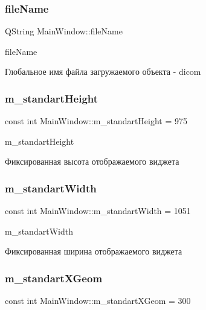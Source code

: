 \subsubsection{\texorpdfstring{file\+Name}{fileName}}
{\footnotesize\ttfamily Q\+String Main\+Window\+::file\+Name}



file\+Name 

Глобальное имя файла загружаемого объекта -\/ dicom \mbox{\label{classMainWindow_a5ebb2638e7863a72adc4e6f75336bd77}} 
\subsubsection{\texorpdfstring{m\+\_\+standart\+Height}{m\_standartHeight}}
{\footnotesize\ttfamily const int Main\+Window\+::m\+\_\+standart\+Height = 975\hspace{0.3cm}{\ttfamily [private]}}



m\+\_\+standart\+Height 

Фиксированная высота отображаемого виджета \mbox{\label{classMainWindow_a2aa939210e4ccc0fdbec8fd7e4497617}} 
\subsubsection{\texorpdfstring{m\+\_\+standart\+Width}{m\_standartWidth}}
{\footnotesize\ttfamily const int Main\+Window\+::m\+\_\+standart\+Width = 1051\hspace{0.3cm}{\ttfamily [private]}}



m\+\_\+standart\+Width 

Фиксированная ширина отображаемого виджета \mbox{\label{classMainWindow_a46d1e00d9af1678f68303e2f04a6a541}} 
\subsubsection{\texorpdfstring{m\+\_\+standart\+X\+Geom}{m\_standartXGeom}}
{\footnotesize\ttfamily const int Main\+Window\+::m\+\_\+standart\+X\+Geom = 300\hspace{0.3cm}{\ttfamily [private]}}



